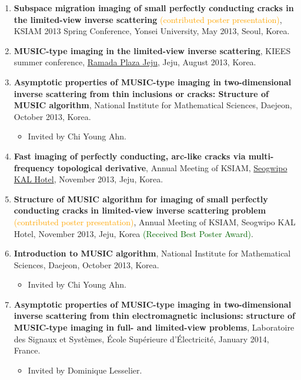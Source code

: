 \documentclass[10pt,A4]{article}
\begin{document}
\begin{enumerate}
\item\label{P-KSIAM2013C} \textbf{Subspace migration imaging of small perfectly conducting cracks in the limited-view inverse scattering} \textcolor{orange}{(contributed poster presentation)}, KSIAM 2013 Spring Conference, Yonsei University, May 2013, Seoul, Korea.
\item\label{P-KIEES2013} \textbf{MUSIC-type imaging in the limited-view inverse scattering}, KIEES summer conference, \href{http://www.ramadajeju.co.kr/eng/}{Ramada Plaza Jeju}, Jeju, August 2013, Korea.
\item\label{P-NIMS2013A} \textbf{Asymptotic properties of MUSIC-type imaging in two-dimensional inverse scattering from thin inclusions or cracks: Structure of MUSIC algorithm}, National Institute for Mathematical Sciences, Daejeon, October 2013, Korea.
    \begin{itemize}
\item Invited by Chi Young Ahn.
\end{itemize}
\item\label{P-KSIAM2013D} \textbf{Fast imaging of perfectly conducting, arc-like cracks via multi-frequency topological derivative}, Annual Meeting of KSIAM, \href{http://www.kalhotel.co.kr/seogwipo/}{Seogwipo KAL Hotel}, November 2013, Jeju, Korea.
\item\label{P-KSIAM2013E} \textbf{Structure of MUSIC algorithm for imaging of small perfectly conducting cracks in limited-view inverse scattering problem} \textcolor{orange}{(contributed poster presentation)}, Annual Meeting of KSIAM, Seogwipo KAL Hotel, November 2013, Jeju, Korea \textcolor{darkgreen}{(Received Best Poster Award)}.
\item\label{P-NIMS2013B} \textbf{Introduction to MUSIC algorithm}, National Institute for Mathematical Sciences, Daejeon, October 2013, Korea.
    \begin{itemize}
\item Invited by Chi Young Ahn.
\end{itemize}
\item\label{P-SUPELEC2014A} \textbf{Asymptotic properties of MUSIC-type imaging in two-dimensional inverse scattering from thin electromagnetic inclusions: structure of MUSIC-type imaging in full- and limited-view problems}, Laboratoire des Signaux et Syst\`emes, \'Ecole Sup\'erieure d'\'Electricit\'e, January 2014, France.
\begin{itemize}
\item Invited by Dominique Lesselier.
\end{itemize}

\end{enumerate}
\end{document}
